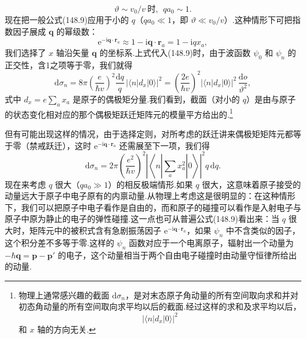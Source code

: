 \begin{equation}
  \vartheta\sim v_0/v\ \text{时},\ \ qa_0\sim1.
\end{equation}
现在把一般公式(148.9)应用于小的 $q$（$qa_0\ll1$，即 $\vartheta\ll v_0/v$）.这种情形下可把指数因子展成 $\boldsymbol{q}$ 的幂级数：
\begin{equation*}
  \mathrm{e}^{-\mathrm{i}\boldsymbol{q}\cdot\boldsymbol{r}_a}\approx1-\mathrm{i}\boldsymbol{q}\cdot\boldsymbol{r}_a=1-\mathrm{i}qx_a,
\end{equation*}
我们选择了 $x$ 轴沿矢量 $\boldsymbol{q}$ 的坐标系.上式代入(148.9)时，由于波函数 $\psi_0$ 和 $\psi_n$ 的正交性，含1之项等于零，我们就得
\begin{equation}
  \mathrm{d}\sigma_n=8\pi\left(\frac{e}{\hbar v}\right)^2\frac{\mathrm{d}q}{q}\,
  |\langle n|d_x|0\rangle|^2
  =\left(\frac{2e}{\hbar v}\right)^2|\langle n|d_x|0\rangle|^2\,\frac{\mathrm{d}o}{\vartheta^2},
\end{equation}
式中 $d_x=e\sum_ax_a$ 是原子的偶极矩分量.我们看到，截面（对小的 $q$）是由与原子的状态变化相对应的那个偶极矩跃迁矩阵元的模量平方给出的.\footnote{物理上通常感兴趣的截面 $\mathrm{d}\sigma_n$，是对末态原子角动量的所有空间取向求和并对初态角动量的所有空间取向求平均以后的截面.经过这样的求和及求平均以后，
\begin{equation*}
  |\langle n|d_x|0\rangle|^2
\end{equation*}
和 $x$ 轴的方向无关.}

但有可能出现这样的情况，由于选择定则，对所考虑的跃迁讲来偶极矩矩阵元都等于零（禁戒跃迁），这时 $\mathrm{e}^{-\mathrm{i}\boldsymbol{q}\cdot\boldsymbol{r}_a}$ 还需展至下一项，我们得
\begin{equation}
  \mathrm{d}\sigma_n=2\pi\left(\frac{e^2}{\hbar v}\right)^2
  \left|\left\langle n\left|\sum_ax_a^2\right|0\right\rangle\right|^2q\,\mathrm{d}q.
\end{equation}
现在来考虑 $q$ 很大（$qa_0\gg1$）的相反极端情形.如果 $q$ 很大，这意味着原子接受的动量远大于原子中电子原有的内禀动量.从物理上考虑这是很明显的：在这种情形下，我们可以把原子中电子看作是自由的，而和原子的碰撞可以看作是入射电子与原子中原为静止的电子的弹性碰撞.这一点也可从普遍公式(148.9)看出来：当 $q$ 很大时，矩阵元中的被积式含有急剧振荡因子 $\mathrm{e}^{-\mathrm{i}\boldsymbol{q}\cdot\boldsymbol{r}_a}$，如果 $\psi_n$ 中不含类似的因子，这个积分差不多等于零.这样的 $\psi_n$ 函数对应于一个电离原子，辐射出一个动量为 $-\hbar\boldsymbol{q}=\boldsymbol{p}-\boldsymbol{p}'$ 的电子，这个动量相当于两个自由电子碰撞时由动量守恒律所给出的动量.


